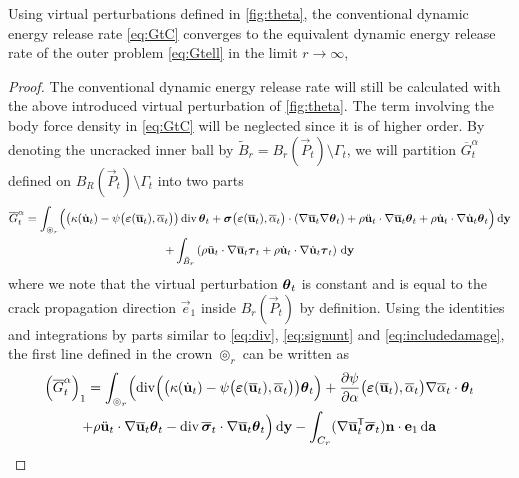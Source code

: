 \begin{proposition} \label{prop:GalphatoG}
Using virtual perturbations defined in \cref{fig:theta}, the conventional dynamic energy release rate \eqref{eq:GtC} converges to the equivalent dynamic energy release rate of the outer problem \eqref{eq:Gtell} in the limit $r\to\infty$,
\end{proposition}

\begin{proof}
The conventional dynamic energy release rate will still be calculated with the above introduced virtual perturbation of \cref{fig:theta}. The term involving the body force density in \eqref{eq:GtC} will be neglected since it is of higher order. By denoting the uncracked inner ball by $\tilde{B}_r=B_r(\vec{P}_t)\setminus\Gamma_t$, we will partition $\overline{G}^\alpha_t$ defined on $B_R(\vec{P}_t)\setminus\Gamma_t$ into two parts
\begin{multline} \label{eq:Galphaintwoparts}
\overline{G}^\alpha_t=\int_{\circledcirc_r}\Bigl(\bigl(\kappa(\dot{\vec{u}}_t)-\psi\bigl(\eps(\overline{\vec{u}}_t),\overline{\alpha}_t\bigr)\bigr)\div\vtheta_t+\sig\bigl(\eps(\overline{\vec{u}}_t),\overline{\alpha}_t\bigr)\cdot(\nabla\overline{\vec{u}}_t\nabla\vtheta_t)+\rho\ddot{\vec{u}}_t\cdot\nabla\overline{\vec{u}}_t\vtheta_t+\rho\dot{\vec{u}}_t\cdot\nabla\dot{\vec{u}}_t\vtheta_t\Bigr)\D{\vec{y}} \\
+\int_{\tilde{B}_r}\left(\rho\ddot{\vec{u}}_t\cdot\nabla\overline{\vec{u}}_t\vtau_t+\rho\dot{\vec{u}}_t\cdot\nabla\dot{\vec{u}}_t\vtau_t\right)\D{\vec{y}}
\end{multline}
where we note that the virtual perturbation $\vtheta_t$ is constant and is equal to the crack propagation direction $\vec{e}_1$ inside $B_r(\vec{P}_t)$ by definition. Using the identities and integrations by parts similar to \eqref{eq:div}, \eqref{eq:signunt} and \eqref{eq:includedamage}, the first line defined in the crown $\circledcirc_r$ can be written as
\begin{multline*}
\left(\overline{G}^\alpha_t\right)_1=\int_{\circledcirc_r}\Bigl(\div\Bigl(\bigl(\kappa(\dot{\vec{u}}_t)-\psi\bigl(\eps(\overline{\vec{u}}_t),\overline{\alpha}_t\bigr)\bigr)\vtheta_t\Bigr)+\frac{\partial\psi}{\partial\alpha}\bigl(\eps(\overline{\vec{u}}_t),\overline{\alpha}_t\bigr)\nabla\overline{\alpha}_t\cdot\vtheta_t \\
+\rho\ddot{\vec{u}}_t\cdot\nabla\overline{\vec{u}}_t\vtheta_t-\div\overline{\sig}_t\cdot\nabla\overline{\vec{u}}_t\vtheta_t\Bigr)\D{\vec{y}}-\int_{C_r}(\nabla\overline{\vec{u}}_t^\mT\overline{\sig}_t)\vec{n}\cdot\vec{e}_1\D{\vec{a}}

\end{multline*}
\end{proof}
